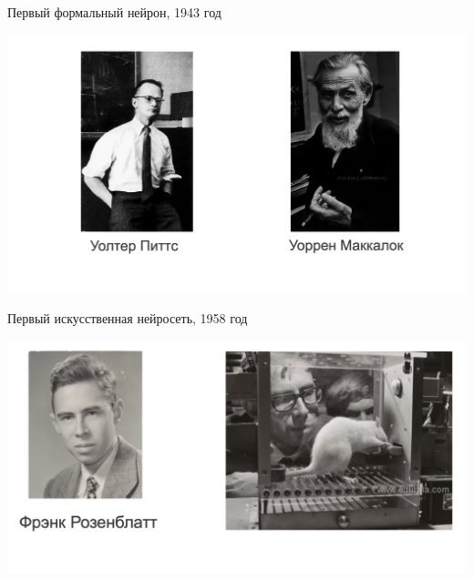 \documentclass[notes,12pt, aspectratio=169]{beamer}
\begin{document}
%
%





\begin{frame}{Первый формальный нейрон, 1943 год}
\begin{center}
	\includegraphics[width=0.9\paperwidth]{makkalok_pits.png}
\end{center}
\end{frame}


\begin{frame}{Первый искусственная нейросеть, 1958 год}
\begin{center}
\includegraphics[width=0.9\paperwidth]{rozenblat.png}
\end{center}
\end{frame}
\end{document}
